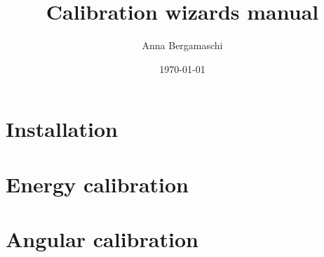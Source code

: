 \documentclass{report}
\begin{document}
\title{Calibration wizards manual}
\author{Anna Bergamaschi}
\date{\today}
\maketitle
\chapter{Installation}


\chapter{Energy calibration}



\chapter{Angular calibration}

\end{document}

